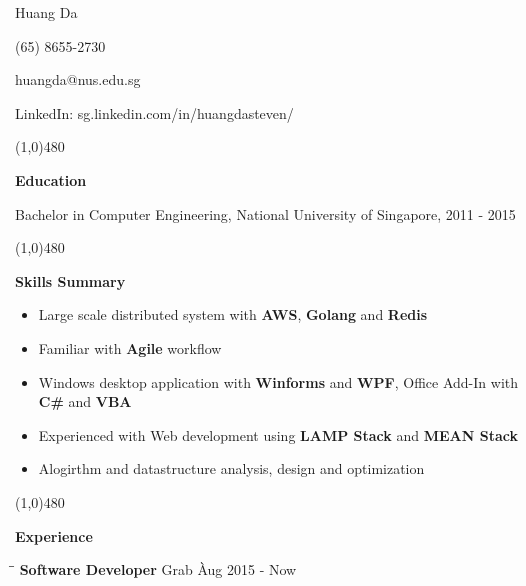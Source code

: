 \documentclass[9pt]{article}
\begin{document}
\clearpage

\centerline{{\Huge \sc Huang Da} }
\centerline{(65) 8655-2730}
\centerline{huangda@nus.edu.sg}
\centerline{LinkedIn: sg.linkedin.com/in/huangdasteven/}

\noindent

\centerline{\line(1,0){480}}

\medskip

\centerline {\Large \bf Education}

\smallskip

Bachelor in Computer Engineering, National University of Singapore, 2011 - 2015

\centerline{\line(1,0){480}}

\medskip

\centerline {\Large \bf Skills Summary}

\vspace{-6pt}\smallskip

\begin{itemize} 
  \item Large scale distributed system with {\bf AWS}, {\bf Golang} and {\bf Redis} \vspace{-6pt}
  \item Familiar with {\bf Agile} workflow \vspace{-6pt}
  \item Windows desktop application with {\bf Winforms} and {\bf WPF}, Office Add-In with {\bf C\#}  and {\bf VBA}\vspace{-6pt}
  \item Experienced with Web development using {\bf LAMP Stack} and {\bf MEAN Stack} \vspace{-6pt}
  \item Alogirthm and datastructure analysis, design and optimization \vspace{-6pt}
\end{itemize}

\centerline{\line(1,0){480}}

\medskip

\centerline {\Large \bf Experience}

\medskip


\begin{tabbing}
\hspace{2.6in}\= \hspace{2.6in}\= \kill
{\bf Software Developer} \> Grab \`Aug 2015 - Now\
\end{tabbing}
\end{document}
